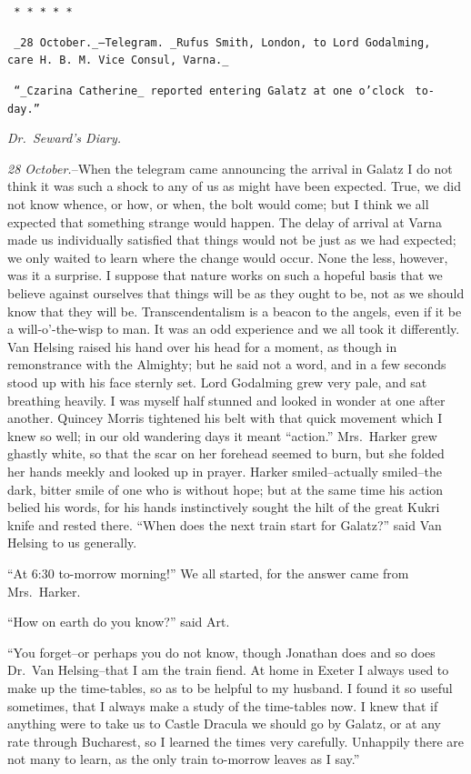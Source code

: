 \documentclass[12pt,openright]{book}
\begin{document}
\texttt{   *       *       *       *       *}

\texttt{ \_28 October.\_--Telegram. \_Rufus Smith, London, to Lord Godalming,}
\texttt{ care H. B. M. Vice Consul, Varna.\_}

\texttt{ “\_Czarina Catherine\_ reported entering Galatz at one o’clock}
\texttt{ to-day.”}

\textit{Dr. Seward’s Diary.}

\textit{28 October.}–When the telegram came announcing the arrival in Galatz I do not think it was such a shock to any of us as might have been expected. True, we did not know whence, or how, or when, the bolt would come; but I think we all expected that something strange would happen. The delay of arrival at Varna made us individually satisfied that things would not be just as we had expected; we only waited to learn where the change would occur. None the less, however, was it a surprise. I suppose that nature works on such a hopeful basis that we believe against ourselves that things will be as they ought to be, not as we should know that they will be. Transcendentalism is a beacon to the angels, even if it be a will-o’-the-wisp to man. It was an odd experience and we all took it differently. Van Helsing raised his hand over his head for a moment, as though in remonstrance with the Almighty; but he said not a word, and in a few seconds stood up with his face sternly set. Lord Godalming grew very pale, and sat breathing heavily. I was myself half stunned and looked in wonder at one after another. Quincey Morris tightened his belt with that quick movement which I knew so well; in our old wandering days it meant “action.” Mrs. Harker grew ghastly white, so that the scar on her forehead seemed to burn, but she folded her hands meekly and looked up in prayer. Harker smiled–actually smiled–the dark, bitter smile of one who is without hope; but at the same time his action belied his words, for his hands instinctively sought the hilt of the great Kukri knife and rested there. “When does the next train start for Galatz?” said Van Helsing to us generally.

“At 6:30 to-morrow morning!” We all started, for the answer came from Mrs. Harker.

“How on earth do you know?” said Art.

“You forget–or perhaps you do not know, though Jonathan does and so does Dr. Van Helsing–that I am the train fiend. At home in Exeter I always used to make up the time-tables, so as to be helpful to my husband. I found it so useful sometimes, that I always make a study of the time-tables now. I knew that if anything were to take us to Castle Dracula we should go by Galatz, or at any rate through Bucharest, so I learned the times very carefully. Unhappily there are not many to learn, as the only train to-morrow leaves as I say.”
\end{document}
